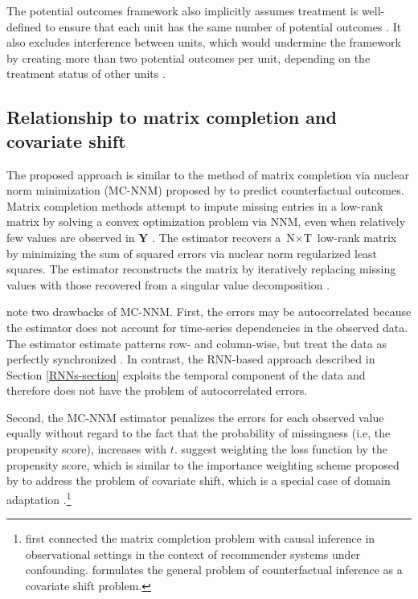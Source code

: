 \documentclass[hidelinks,12pt]{article}
\begin{document}
The potential outcomes framework also implicitly assumes treatment is well-defined to ensure that each unit has the same number of potential outcomes \citep{imbens2015causal}. It also excludes interference between units, which would undermine the framework by creating more than two potential outcomes per unit, depending on the treatment status of other units \citep{rubin1990}.

\subsection{Relationship to matrix completion and covariate shift}

The proposed approach is similar to the method of matrix completion via nuclear norm minimization (MC-NNM) proposed by \citet{athey2017matrix} to predict counterfactual outcomes. Matrix completion methods attempt to impute missing entries in a low-rank matrix by solving a convex optimization problem via NNM, even when relatively few values are observed in $\boldsymbol{Y}$ \citep{candes2009exact,candes2010matrix}. The estimator recovers a $\text{N} \times \text{T}$ low-rank matrix by minimizing the sum of squared errors via nuclear norm regularized least squares. The estimator reconstructs the matrix by iteratively replacing missing values with those recovered from a singular value decomposition \citep{mazumder2010spectral}. 

\citet{athey2017matrix} note two drawbacks of MC-NNM. First, the errors may be autocorrelated because the estimator does not account for time-series dependencies in the observed data. The estimator estimate patterns row- and column-wise, but treat the data as perfectly synchronized \citep{yoon2018estimating}. In contrast, the RNN-based approach described in Section \ref{RNNs-section} exploits the temporal component of the data and therefore does not have the problem of autocorrelated errors. 

Second, the MC-NNM estimator penalizes the errors for each observed value equally without regard to the fact that the probability of missingness (i.e, the propensity score), increases with $t$. \citet{athey2017matrix} suggest weighting the loss function by the propensity score, which is similar to the importance weighting scheme proposed by \citet{cortes2008sample} to address the problem of covariate shift, which is a special case of domain adaptation \citep{huang2007correcting,ben2007analysis,bickel2009discriminative,cortes2010learning,2015arXiv150507818G}.\footnote{\citet{schnabel2016recommendations} first connected the matrix completion problem with causal inference in observational settings in the context of recommender systems under confounding. \citet{johansson2016learning} formulates the general problem of counterfactual inference as a covariate shift problem.} 
\end{document}
